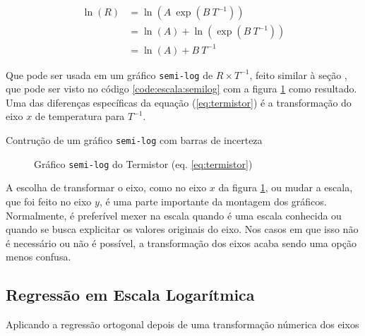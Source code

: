     \begin{align*}
        \ln(R)
            &= \ln\left(A ~ \exp\left(B ~ T^{-1}\right) \right) \\
            &= \ln(A) + \ln\left(\exp\left(B ~ T^{-1}\right) \right) \\
            &= \ln(A) + B ~ T^{-1}
    \end{align*}

    Que pode ser usada em um gráfico \texttt{semi-log} de $R \times T^{-1}$, feito similar à seção , que pode ser visto no código \ref{code:escala:semilog} com a figura \ref{fig:escala:semilog:resultado} como resultado. Uma das diferenças específicas da equação (\ref{eq:termistor}) é a transformação do eixo $x$ de temperatura para $T^{-1}$.

    \begin{listing}[H]
        \caption{Contrução de um gráfico \texttt{semi-log} com barras de incerteza}
        \label{code:escala:semilog}

    \end{listing}

    \begin{figure}[H]
        \centering
        

        \caption{Gráfico \texttt{semi-log} do Termistor (eq. \ref{eq:termistor})}
        \label{fig:escala:semilog:resultado}
    \end{figure}

    \begin{nota}
        A escolha de transformar o eixo, como no eixo $x$ da figura \ref{fig:escala:semilog:resultado}, ou mudar a escala, que foi feito no eixo $y$, é uma parte importante da montagem dos gráficos. Normalmente, é preferível mexer na escala quando é uma escala conhecida ou quando se busca explicitar os valores originais do eixo. Nos casos em que isso não é necessário ou não é possível, a transformação dos eixos acaba sendo uma opção menos confusa.
    \end{nota}


\subsection{Regressão em Escala Logarítmica} \label{sec:escala:regres}

    \begin{listing}[H]
        \caption{Aplicando a regressão ortogonal depois de uma transformação númerica dos eixos}
        \label{code:escala:regres}

    \end{listing}

